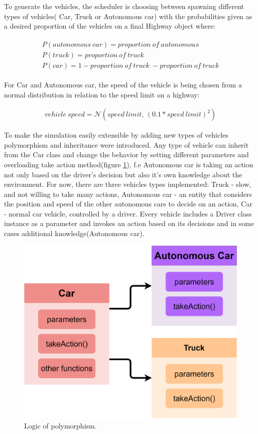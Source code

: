 To generate the vehicles, the scheduler is choosing between spawning different types of vehicles( Car, Truck or Autonomous car) with the probabilities given as a desired proportion of the vehicles on a final Highway object where:

\begin{multline}
    \begin{gathered}
        {P(autonomous\ car)}=proportion\ of\ autonomous\\
        {P(truck)}=proportion\ of\ truck\\
        {P(car)}=1-proportion\ of\ truck\ - proportion\ of\ truck
    \end{gathered}
\end{multline}

For Car and Autonomous car, the speed of the vehicle is being chosen from a normal distribution in relation to the speed limit on a highway:

\begin{multline}
  vehicle\ speed = \mathcal{N}(speed\ limit,\,(0.1*speed\ limit)^{2})
\end{multline}

To make the simulation easily extensible by adding new types of vehicles polymorphism and inheritance were introduced. Any type of vehicle can inherit from the Car class and change the behavior by setting different parameters and overloading take action method(figure \ref{fig:polymorphism}), f.e Autonomous car is taking an action not only based on the driver's decision but also it's own knowledge about the environment. For now, there are three vehicles types implemented: Truck - slow, and not willing to take many actions, Autonomous car - an entity that considers the position and speed of the other autonomous cars to decide on an action, Car - normal car vehicle, controlled by a driver. Every vehicle includes a Driver class instance as a parameter and invokes an action based on its decisions and in some cases additional knowledge(Autonomous car).

\begin{figure}[H]
    \centering
    \includegraphics[width=0.9\linewidth]{images/polymorphism.png}
    \caption{Logic of polymorphism.}
    \label{fig:polymorphism}
\end{figure}

